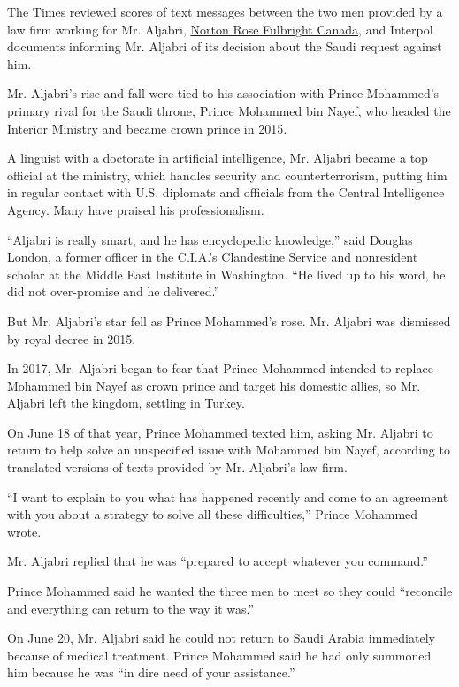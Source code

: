 The Times reviewed scores of text messages between the two men provided
by a law firm working for Mr. Aljabri,
\href{https://www.nortonrosefulbright.com/en-ca}{Norton Rose Fulbright
Canada}, and Interpol documents informing Mr. Aljabri of its decision
about the Saudi request against him.

Mr. Aljabri's rise and fall were tied to his association with Prince
Mohammed's primary rival for the Saudi throne, Prince Mohammed bin
Nayef, who headed the Interior Ministry and became crown prince in 2015.

A linguist with a doctorate in artificial intelligence, Mr. Aljabri
became a top official at the ministry, which handles security and
counterterrorism, putting him in regular contact with U.S. diplomats and
officials from the Central Intelligence Agency. Many have praised his
professionalism.

``Aljabri is really smart, and he has encyclopedic knowledge,'' said
Douglas London, a former officer in the C.I.A.'s
\href{https://www.cia.gov/offices-of-cia/clandestine-service/index.html}{Clandestine
Service} and nonresident scholar at the Middle East Institute in
Washington. ``He lived up to his word, he did not over-promise and he
delivered.''

But Mr. Aljabri's star fell as Prince Mohammed's rose. Mr. Aljabri was
dismissed by royal decree in 2015.

In 2017, Mr. Aljabri began to fear that Prince Mohammed intended to
replace Mohammed bin Nayef as crown prince and target his domestic
allies, so Mr. Aljabri left the kingdom, settling in Turkey.

On June 18 of that year, Prince Mohammed texted him, asking Mr. Aljabri
to return to help solve an unspecified issue with Mohammed bin Nayef,
according to translated versions of texts provided by Mr. Aljabri's law
firm.

``I want to explain to you what has happened recently and come to an
agreement with you about a strategy to solve all these difficulties,''
Prince Mohammed wrote.

Mr. Aljabri replied that he was ``prepared to accept whatever you
command.''

Prince Mohammed said he wanted the three men to meet so they could
``reconcile and everything can return to the way it was.''

On June 20, Mr. Aljabri said he could not return to Saudi Arabia
immediately because of medical treatment. Prince Mohammed said he had
only summoned him because he was ``in dire need of your assistance.''

